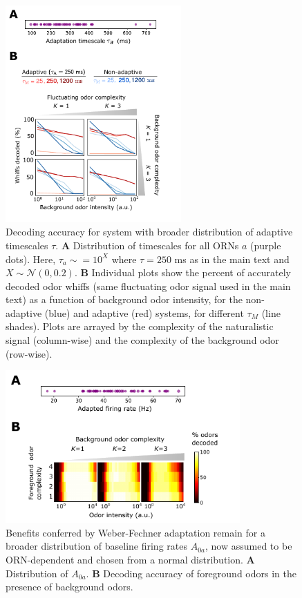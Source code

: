 \documentclass[10pt,prl,aps,showpacs,twocolumn,unsortedaddress,showkeys,linenumbers]{revtex4-1}
\begin{document}
\renewcommand\thefigure{\ref{fig:decoding}--figure supplement 1}  


\begin{figure}
\centering
\includegraphics[width=0.6\textwidth]{figures/temporal_broad_tA.pdf}
\caption{Decoding accuracy for system with broader distribution of adaptive timescales $\tau$.
\textbf{A} Distribution of timescales for all ORNs $a$ (purple dots). Here, $\tau_a \sim = 10^X$ where $\tau = 250$ ms as in the main text and $X \sim \mathcal N(0, 0.2)$. 
\textbf{B}  Individual plots show the percent of accurately decoded odor whiffs (same fluctuating odor signal used in the main text) as a function of background odor intensity, for the non-adaptive (blue) and adaptive (red) systems, for different $\tau_M$ (line shades). Plots are arrayed by the complexity of the naturalistic signal (column-wise) and the complexity of the background odor (row-wise).
}
\label{fig:SI_broad_tA}
\end{figure}



\renewcommand\thefigure{\ref{fig:decoding}--figure supplement 2}  


\begin{figure}
\centering
\includegraphics[width=0.8\textwidth]{figures/broad_A0}
\caption{Benefits conferred by Weber-Fechner adaptation remain for a broader distribution of baseline firing rates $A_{0a}$, now assumed to be ORN-dependent and chosen from a normal distribution.
\textbf{A} Distribution of $A_{0a}$.
\textbf{B} Decoding accuracy of foreground odors in the presence of background odors.}
\label{fig:SI_broad_A0}
\end{figure}
\end{document}
